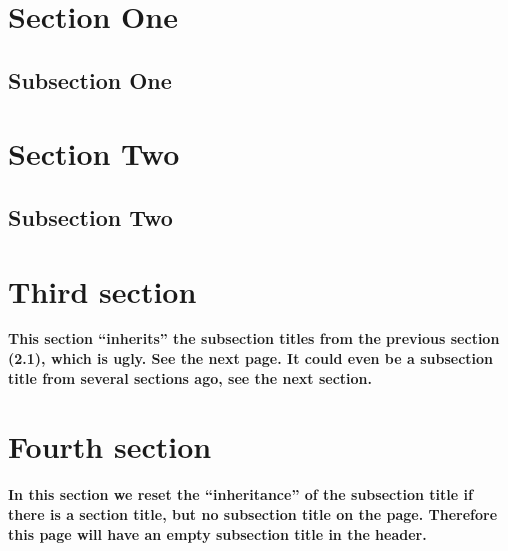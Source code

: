 \documentclass{article}
\newcommand\rightheader{\firstrightxmark}
\renewcommand*{\sectionmark}[1]{\extramarksleft{\thesection\ #1}}
\newcommand\rightreset{%
  \ifextramarksmissing{left}{}
  {%
    \ifextramarksmissing {right}
    {\extramarksreset{right}}
    {}%
  }%
}
\newcounter{thispage}
\newcommand\rightresetbefore{%
  \ifnum \value{thispage}<\value{page}\rightreset\fi
}
\begin{document}
\newpage
\pagestyle{fancy}

\section{Section One}

\subsection{Subsection One}

 \lipsum[1-2]

\section{Section Two}

 \lipsum[3]

\subsection{Subsection Two}

 \lipsum[4-7]

\section{Third section}

\textbf{This section ``inherits'' the subsection titles from the
  previous section (2.1), which is ugly. See the next page. It could
  even be a subsection title from several sections ago, see the next
  section.}

\medskip

\lipsum

\renewcommand{\sectionmark}[1]{%
  \extramarksleft{\thesection. #1}%
  \ifdim\pagetotal<0.5\pagegoal
    \renewcommand\rightheader{\rightreset\firstrightxmark}%
  \else
    \setcounter{thispage}{\value{page}}%
    \renewcommand\rightheader{%
      \rightresetbefore\firstrightxmark\rightreset}%
  \fi
}

\section{Fourth section}
\label{sec:missing}

\textbf{In this section we reset the ``inheritance'' of the subsection title if there is a section title, but no subsection title on the page. Therefore this page will have an empty subsection title in the header.}
\end{document}
